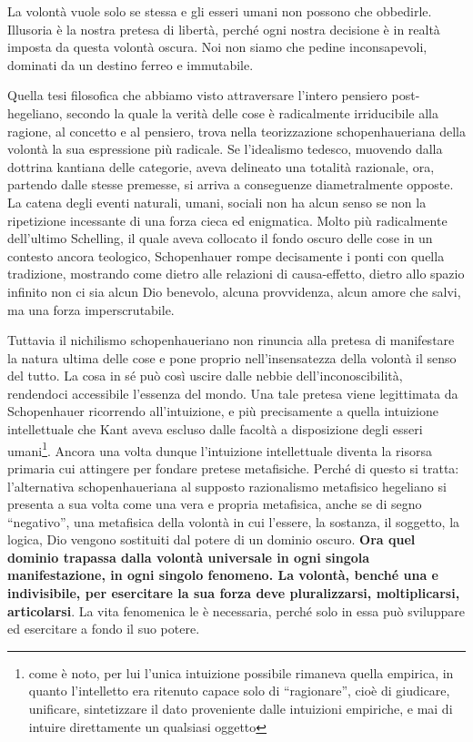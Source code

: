 La volontà vuole solo se stessa e gli esseri umani non possono che obbedirle. Illusoria è la nostra pretesa di libertà, perché ogni nostra decisione è in realtà imposta da questa volontà oscura. Noi non siamo che pedine inconsapevoli, dominati da un destino ferreo e immutabile.

Quella tesi filosofica che abbiamo visto attraversare l’intero pensiero post-hegeliano, secondo la quale la verità delle cose è radicalmente irriducibile alla ragione, al concetto e al pensiero, trova nella teorizzazione schopenhaueriana della volontà la sua espressione più radicale. Se l’idealismo tedesco, muovendo dalla dottrina kantiana delle categorie, aveva delineato una totalità razionale, ora, partendo dalle stesse premesse, si arriva a conseguenze diametralmente opposte. La catena degli eventi naturali, umani, sociali non ha alcun senso se non la ripetizione incessante di una forza cieca ed enigmatica.
Molto più radicalmente dell’ultimo Schelling, il quale aveva collocato il fondo oscuro delle cose in un contesto ancora teologico, Schopenhauer rompe decisamente i ponti con quella tradizione, mostrando come dietro alle relazioni di causa-effetto, dietro allo spazio infinito non ci sia alcun Dio benevolo, alcuna provvidenza, alcun amore che salvi, ma una forza imperscrutabile. 

Tuttavia il nichilismo schopenhaueriano non rinuncia alla pretesa di manifestare la natura ultima delle cose e pone proprio nell’insensatezza della volontà il senso del tutto. La cosa in sé può così uscire dalle nebbie dell’inconoscibilità, rendendoci accessibile l’essenza del mondo. Una tale pretesa viene legittimata da Schopenhauer ricorrendo all’intuizione, e più precisamente a quella intuizione intellettuale che Kant aveva escluso dalle facoltà a disposizione degli esseri umani\footnote{come è noto, per lui l’unica intuizione possibile rimaneva quella empirica, in quanto l’intelletto era ritenuto capace solo di “ragionare”, cioè di giudicare, unificare, sintetizzare il dato proveniente dalle intuizioni empiriche, e mai di intuire direttamente un qualsiasi oggetto}.
Ancora una volta dunque l’intuizione intellettuale diventa la risorsa primaria cui attingere per fondare pretese metafisiche. Perché di questo si tratta: l’alternativa schopenhaueriana al supposto razionalismo metafisico hegeliano si presenta a sua volta come una vera e propria metafisica, anche se di segno “negativo”, una metafisica della volontà in cui l’essere, la sostanza, il soggetto, la logica, Dio vengono sostituiti dal potere di un dominio oscuro. \textbf{Ora quel dominio trapassa dalla volontà universale in ogni singola manifestazione, in ogni singolo fenomeno. La volontà, benché una e indivisibile, per esercitare la sua forza deve pluralizzarsi, moltiplicarsi, articolarsi}. La vita fenomenica le è necessaria, perché solo in essa può sviluppare ed esercitare a fondo il suo potere. 

